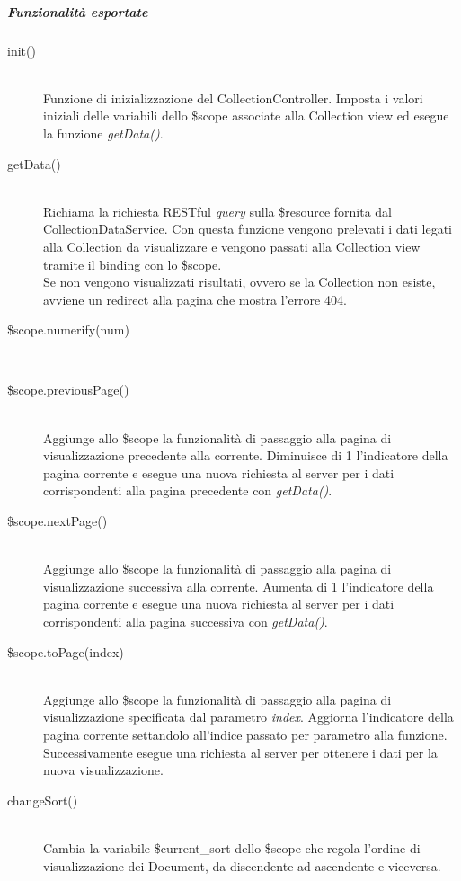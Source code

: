 \subparagraph{Funzionalità esportate}
\begin{description}
 \item[init()] \hfill \\
 Funzione di inizializzazione del CollectionController. Imposta i valori iniziali delle variabili dello
 \$scope associate alla Collection view ed esegue la funzione \emph{getData()}.
 
 \item[getData()] \hfill \\
 Richiama la richiesta RESTful \textit{query} sulla \$resource fornita dal CollectionDataService.
 Con questa funzione vengono prelevati i dati legati alla Collection da visualizzare e vengono
 passati alla Collection view tramite il binding con lo \$scope. \\
 Se non vengono visualizzati risultati, ovvero se la Collection non esiste, avviene un redirect alla pagina
 che mostra l'errore 404.
 
 \item[\$scope.numerify(num)] \hfill \\
 
 \item[\$scope.previousPage()] \hfill \\
 Aggiunge allo \$scope la funzionalità di passaggio alla pagina di visualizzazione precedente alla corrente.
 Diminuisce di 1 l'indicatore della pagina corrente e esegue una nuova richiesta al server per i dati corrispondenti
 alla pagina precedente con \emph{getData()}.
 
 \item[\$scope.nextPage()] \hfill \\
 Aggiunge allo \$scope la funzionalità di passaggio alla pagina di visualizzazione successiva alla corrente.
 Aumenta di 1 l'indicatore della pagina corrente e esegue una nuova richiesta al server per i dati corrispondenti
 alla pagina successiva con \emph{getData()}.
 
 \item[\$scope.toPage(index)] \hfill \\
 Aggiunge allo \$scope la funzionalità di passaggio alla pagina di visualizzazione specificata dal parametro \emph{index}.
 Aggiorna l'indicatore della pagina corrente settandolo all'indice passato per parametro alla funzione.
 Successivamente esegue una richiesta al server per ottenere i dati per la nuova visualizzazione.
 
 \item[changeSort()] \hfill \\
 Cambia la variabile \$current\_sort dello \$scope che regola l'ordine di visualizzazione dei Document, da discendente ad
 ascendente e viceversa.
 

\end{description}
